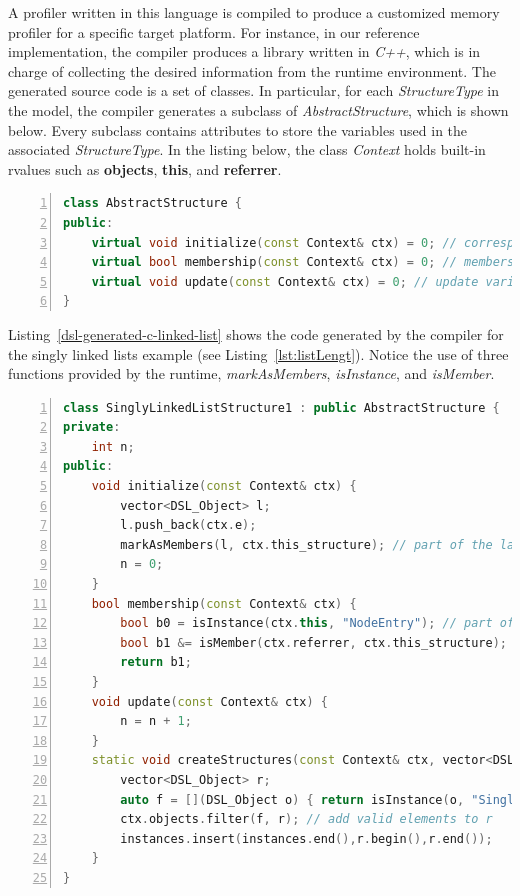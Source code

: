 A profiler written in this language is compiled to produce a customized memory profiler for a specific target platform.
For instance, in our reference implementation, the compiler produces a library written in \textit{C++}, which is in charge of collecting the desired information from the runtime environment.
The generated source code is a set of classes.
In particular, for each \textit{StructureType} in the model, the compiler generates a subclass of \textit{AbstractStructure},  which is shown below.
Every subclass contains attributes to store the variables used in the associated \textit{StructureType}.
In the listing below, the class \textit{Context} holds built-in rvalues such as \textbf{objects}, \textbf{this}, and \textbf{referrer}.
\begin{lstlisting}[language=C++, frame=L,
numbers=left,
numberstyle=\color{black}\scriptsize,xleftmargin=2\parindent]
class AbstractStructure {
public:
	virtual void initialize(const Context& ctx) = 0; // correspond to constructor
	virtual bool membership(const Context& ctx) = 0; // membership function
	virtual void update(const Context& ctx) = 0; // update variables
}
\end{lstlisting}

Listing~\ref{dsl-generated-c-linked-list} shows the code generated by the compiler for the singly linked lists example (see Listing~\ref{lst:listLengt}).
Notice the use of three functions provided by the runtime, \textit{markAsMembers}, \textit{isInstance}, and \textit{isMember}. 

\begin{lstlisting}[language=C++, frame=L,
numbers=left,
numberstyle=\color{black}\scriptsize,xleftmargin=2\parindent, label=dsl-generated-c-linked-list,
caption={To represent a structure type, we declare a subclass of AbstractStructure.}]
class SinglyLinkedListStructure1 : public AbstractStructure {
private:
	int n;
public:
	void initialize(const Context& ctx) {
		vector<DSL_Object> l;
		l.push_back(ctx.e);
		markAsMembers(l, ctx.this_structure); // part of the language runtime support
		n = 0;
	}
	bool membership(const Context& ctx) {
		bool b0 = isInstance(ctx.this, "NodeEntry"); // part of the language runtime support
		bool b1 &= isMember(ctx.referrer, ctx.this_structure); // part of the runtime support
		return b1;
	}
	void update(const Context& ctx) {
		n = n + 1;
	}
	static void createStructures(const Context& ctx, vector<DSL_Object>& instances) {
		vector<DSL_Object> r;
		auto f = [](DSL_Object o) { return isInstance(o, "SinglyLinkedList")};
		ctx.objects.filter(f, r); // add valid elements to r
		instances.insert(instances.end(),r.begin(),r.end()); 
	}
}
\end{lstlisting}

